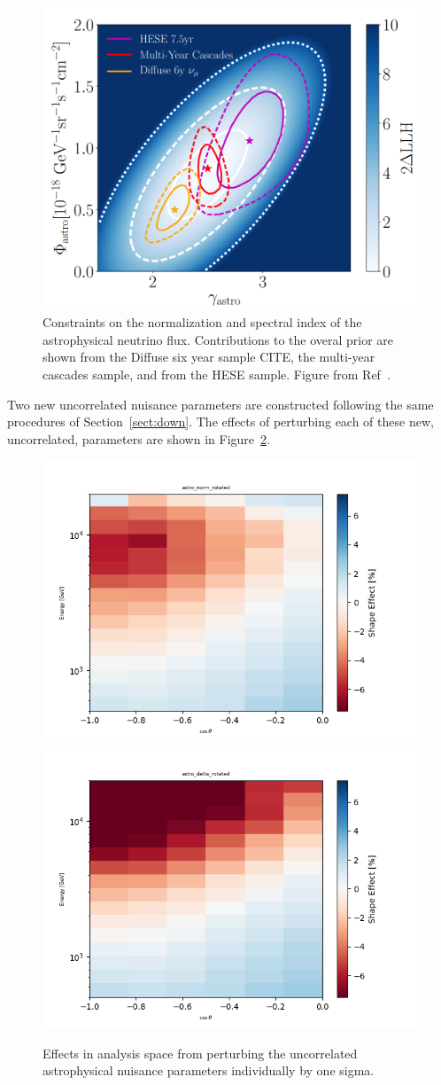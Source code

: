 \documentclass[main.tex]{subfiles}
\begin{document}
\begin{figure}
    \centering
    \includegraphics[width=0.6\linewidth]{figures/hese.png}
    \caption{Constraints on the normalization and spectral index of the astrophysical neutrino flux. Contributions to the overal prior are shown from the Diffuse six year sample CITE, the multi-year cascades sample, and from the HESE sample. Figure from Ref~\cite{Aartsen_2020_prd}.}\label{fig:hese}
\end{figure}

Two new uncorrelated nuisance parameters are constructed following the same procedures of Section~\ref{sect:down}. The effects of perturbing each of these new, uncorrelated, parameters are shown in Figure~\ref{fig:recoastro}.


\begin{figure}
    \centering
    \includegraphics[width=0.4\linewidth]{figures/astro_norm_rotated.png}%
    \includegraphics[width=0.4\linewidth]{figures/astro_delta_rotated.png}
    \caption{Effects in analysis space from perturbing the uncorrelated astrophysical nuisance parameters individually by one sigma.}\label{fig:recoastro}
\end{figure}
\end{document}
